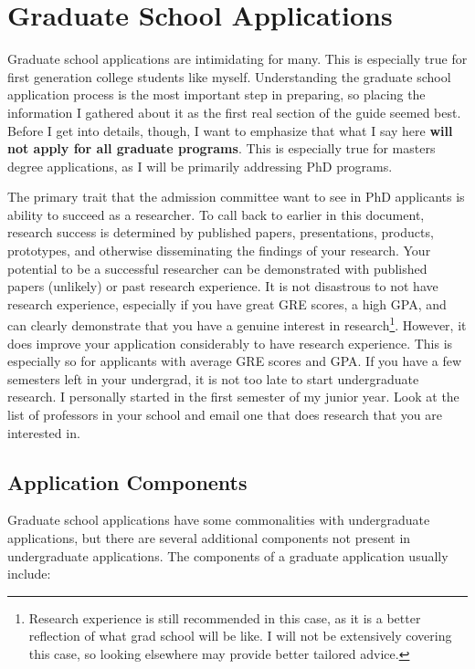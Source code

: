 \documentclass[12pt]{article}
\begin{document}
\section{Graduate School Applications}

Graduate school applications are intimidating for many. This is especially true for first generation college students like myself. Understanding the graduate school application process is the most important step in preparing, so placing the information I gathered about it as the first real section of the guide seemed best. Before I get into details, though, I want to emphasize that what I say here \textbf{will not apply for all graduate programs}. This is especially true for masters degree applications, as I will be primarily addressing PhD programs.

The primary trait that the admission committee want to see in PhD applicants is ability to succeed as a researcher. To call back to earlier in this document, research success is determined by published papers, presentations, products, prototypes, and otherwise disseminating the findings of your research. Your potential to be a successful researcher can be demonstrated with published papers (unlikely) or past research experience. It is not disastrous to not have research experience, especially if you have great GRE scores, a high GPA, and can clearly demonstrate that you have a genuine interest in research\footnote{Research experience is still recommended in this case, as it is a better reflection of what grad school will be like. I will not be extensively covering this case, so looking elsewhere may provide better tailored advice.}. However, it does improve your application considerably to have research experience. This is especially so for applicants with average GRE scores and GPA. If you have a few semesters left in your undergrad, it is not too late to start undergraduate research. I personally started in the first semester of my junior year. Look at the list of professors in your school and email one that does research that you are interested in.

\subsection{Application Components}

Graduate school applications have some commonalities with undergraduate applications, but there are several additional components not present in undergraduate applications. The components of a graduate application usually include:
\end{document}
